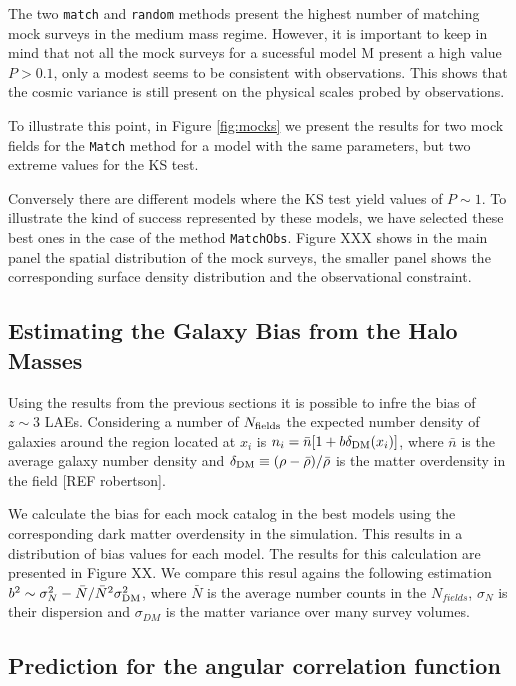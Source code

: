 \documentclass{emulateapj}
\begin{document}
The two {\tt match} and {\tt random} methods present the highest
number of matching mock surveys in the medium mass regime. However, it
is important to keep in mind that not all the mock surveys for a
sucessful model ${\mathrm M}$ present a high value $P>0.1$, only a
modest seems to be consistent with observations. This shows that the
cosmic variance is still present on the physical scales probed by
observations. 

To illustrate this point, in Figure \ref{fig:mocks} we present the
results for two mock fields for the {\tt{Match}} method for a model
with the same parameters, but two extreme values for the KS test. 


Conversely there are different models where the KS test yield values of
$P\sim 1$. To illustrate the kind of success represented by these
models, we have selected these best ones in the case of the method
{\tt{MatchObs}}. Figure XXX shows in the main panel the spatial
distribution of the mock surveys, the smaller panel shows the
corresponding surface density distribution and the observational
constraint.  



\subsection{Estimating the Galaxy Bias from the Halo Masses}
Using the results from the previous sections it is possible to infre
the bias of $z\sim 3$ LAEs. Considering a number of $N_{\rm fields}$
the expected number density of galaxies around the region located at
$x_{i}$ is $n_{i}=\bar{n}[1+ b\delta_{\rm DM}(x_{i})]$, where
$\bar{n}$ is the average galaxy number density and $\delta_{\rm
  DM}\equiv (\rho - \bar{\rho})/\bar{\rho}$ is the matter overdensity
in the field [REF robertson]. 

We calculate the bias for each mock catalog in the best models using
the corresponding dark matter overdensity in the simulation. This
results in a distribution of bias values for each model. The results
for this calculation are presented in Figure XX.  We compare this
resul agains the following estimation $b^{2}\sim {\sigma_{N}^{2} -
  \bar{N}}/\bar{N}^{2}\sigma_{\rm DM}^{2}$, where $\bar{N}$ is the
average number counts in the $N_{fields}$, $\sigma_{N}$ is their
dispersion and $\sigma_{DM}$ is the matter variance over many survey
volumes. 

\subsection{Prediction for the angular correlation function}
\end{document}
